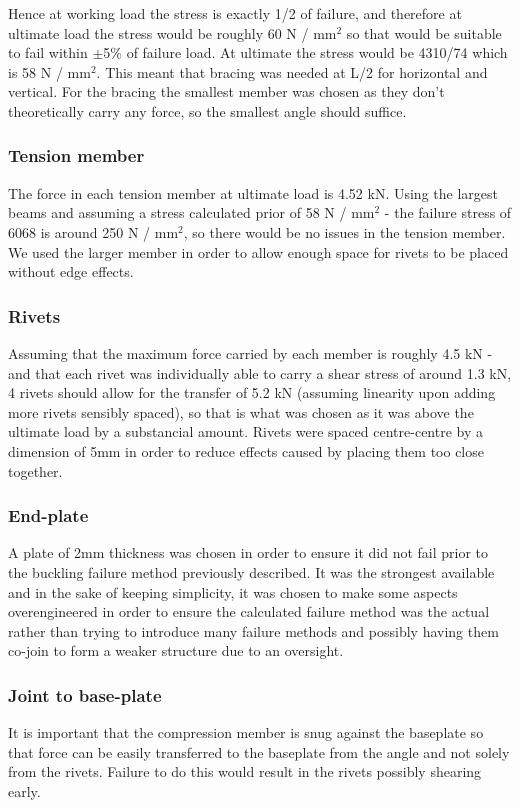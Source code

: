 \documentclass[12pt]{article}
\begin{document}
                    Hence at working load the stress is exactly 1/2 of failure, and therefore at ultimate load the stress would be roughly 60 N / mm$^2$ so that would be suitable to fail within
                    $\pm$5\% of failure load. At ultimate the stress would be 4310/74 which is 58 N / mm$^2$. This meant that bracing was needed at L/2 for horizontal and vertical. For the bracing
                    the smallest member was chosen as they don't theoretically carry any force, so the smallest angle should suffice.
                \subsubsection{Tension member}
                    The force in each tension member at ultimate load is 4.52 kN. Using the largest beams and assuming a stress calculated prior of 58 N / mm$^2$ - the failure
                    stress of 6068 is around 250 N / mm$^2$, so there would be no issues in the tension member. We used the larger member in order to allow enough space for rivets to be
                    placed without edge effects.
                \subsubsection{Rivets}
                    Assuming that the maximum force carried by each member is roughly 4.5 kN - and that each rivet was individually able to carry a shear stress of around 1.3 kN,
                    4 rivets should allow for the transfer of 5.2 kN (assuming linearity upon adding more rivets sensibly spaced), so that is what was chosen as it was above the
                    ultimate load by a substancial amount. Rivets were spaced centre-centre by a dimension of 5mm in order to reduce effects caused by placing them too close together. 
                \subsubsection{End-plate}
                    A plate of 2mm thickness was chosen in order to ensure it did not fail prior to the buckling failure method previously described. It was the strongest available
                    and in the sake of keeping simplicity, it was chosen to make some aspects overengineered in order to ensure the calculated failure method was the actual rather than
                    trying to introduce many failure methods and possibly having them co-join to form a weaker structure due to an oversight. 
                \subsubsection{Joint to base-plate}
                    It is important that the compression member is snug against the baseplate so that force can be easily transferred to the baseplate from the angle and not solely from the rivets.
                    Failure to do this would result in the rivets possibly shearing early.
\end{document}
